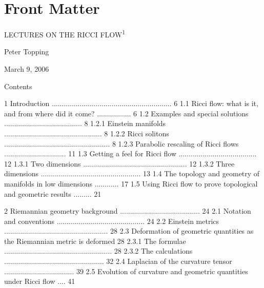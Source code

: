\chapter*{Front Matter}

\begin{center}
\vspace*{0.33\textheight}

{\Large LECTURES ON THE RICCI FLOW\textsuperscript{1}}

\vspace{2.5em}

Peter Topping

\vspace{2.0em}

March 9, 2006

\vfill
\end{center}


Contents

\begingroup
\sloppy

1 Introduction ............................................................ 6
1.1 Ricci flow: what is it, and from where did it come? ................. 6
1.2 Examples and special solutions ....................................... 8
1.2.1 Einstein manifolds ................................................. 8
1.2.2 Ricci solitons ..................................................... 8
1.2.3 Parabolic rescaling of Ricci flows ............................... 11
1.3 Getting a feel for Ricci flow ....................................... 12
1.3.1 Two dimensions .................................................... 12
1.3.2 Three dimensions .................................................. 13
1.4 The topology and geometry of manifolds in low dimensions ............ 17
1.5 Using Ricci flow to prove topological and geometric results ......... 21

2 Riemannian geometry background ........................................ 24
2.1 Notation and conventions ............................................ 24
2.2 Einstein metrics .................................................... 28
2.3 Deformation of geometric quantities as the Riemannian metric is deformed 28
2.3.1 The formulae ...................................................... 28
2.3.2 The calculations .................................................. 32
2.4 Laplacian of the curvature tensor ................................... 39
2.5 Evolution of curvature and geometric quantities under Ricci flow .... 41

